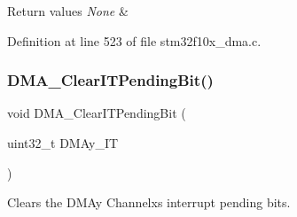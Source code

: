 \begin{DoxyRetVals}{Return values}
{\em None} & \\
\hline
\end{DoxyRetVals}


Definition at line 523 of file stm32f10x\+\_\+dma.\+c.

\mbox{\label{group___d_m_a___private___functions_ga91a7340e5b334a942f3eb1e05ed5f67a}} 
\subsubsection{\texorpdfstring{D\+M\+A\+\_\+\+Clear\+I\+T\+Pending\+Bit()}{DMA\_ClearITPendingBit()}}
{\footnotesize\ttfamily void D\+M\+A\+\_\+\+Clear\+I\+T\+Pending\+Bit (\begin{DoxyParamCaption}\item[{uint32\+\_\+t}]{D\+M\+Ay\+\_\+\+IT }\end{DoxyParamCaption})}



Clears the D\+M\+Ay Channelx\textquotesingle{}s interrupt pending bits. 


